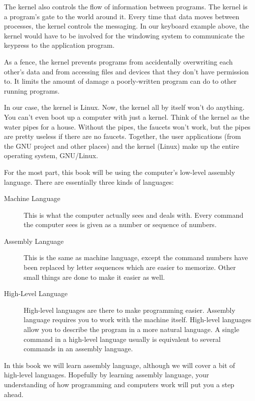 The kernel also controls the flow of information between programs.  
The kernel is a program's gate to the world around it.  Every time that
data moves between processes, the kernel controls the messaging.  In our
keyboard example above, the kernel would have to be involved for the
windowing system to communicate the keypress to the application program.

As a fence, the kernel
prevents programs from accidentally overwriting each other's data and from
accessing files and devices that they don't have permission to.  It
limits the amount of damage a poorly-written program can do to other 
running programs.

In our case, the kernel
is Linux.  Now, the kernel 
all by itself won't do anything.  You can't even
boot up a computer with just a kernel.  Think of the kernel as the water pipes
for a house.  Without the pipes, the faucets won't work, but the pipes are
pretty useless if there are no faucets.  Together, the user applications
(from the GNU project and other places) and the kernel (Linux) make 
up the entire operating system, GNU/Linux.

For the most part, this book will be using the computer's low-level
assembly language.  There are essentially three kinds of languages:


\begin{description}
\item[Machine Language] This is what the computer actually sees and deals with.  Every
command the computer sees is given as a number or sequence of
numbers.
\item[Assembly Language] This is the same as machine language, except the command numbers
have been replaced by letter sequences which are easier to memorize.
Other small things are done to make it easier as well.
\item[High-Level Language] High-level languages are there to make programming easier.  Assembly
language requires you to work with the machine itself.  High-level
languages allow you to describe the program in a more natural language.
A single command in a high-level language usually is equivalent to
several commands in an assembly language.
\end{description}

In this book we will learn assembly language, although we will cover a
bit of high-level languages.  
Hopefully by learning assembly language, your understanding of how programming
and computers work will put you a step ahead.

